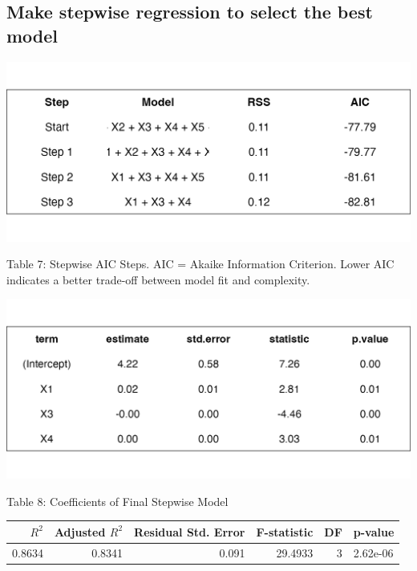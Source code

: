 \documentclass[
  12pt,
]{article}
\begin{document}
\subsection{Make stepwise regression to select the best
model}\label{make-stepwise-regression-to-select-the-best-model}

\begin{minipage}{0.48\textwidth}
\centering
\includegraphics[width=\linewidth]{figures/stepwise_aic_table.png}
\vspace{-2em}
{\fontsize{12}{14}\selectfont Table 7: Stepwise AIC Steps. AIC = Akaike Information Criterion. Lower AIC indicates a better trade-off between model fit and complexity.\par}
\end{minipage}
\hfill
\begin{minipage}{0.48\textwidth}
\centering
\includegraphics[width=\linewidth]{figures/stepwise_coef_table.png}\\
\vspace{-2em}
{\fontsize{12}{14}\selectfont Table 8: Coefficients of Final Stepwise Model\par}
\end{minipage}

\addtocounter{table}{2}

\begin{table}[!h]
\centering\begingroup\fontsize{8}{10}\selectfont

\begin{tabular}{rrrrrl}
\toprule
$R^2$ & Adjusted $R^2$ & Residual Std. Error & F-statistic & DF & p-value\\
\midrule
0.8634 & 0.8341 & 0.091 & 29.4933 & 3 & 2.62e-06\\
\bottomrule
\end{tabular}
\endgroup{}
\end{table}
\end{document}
